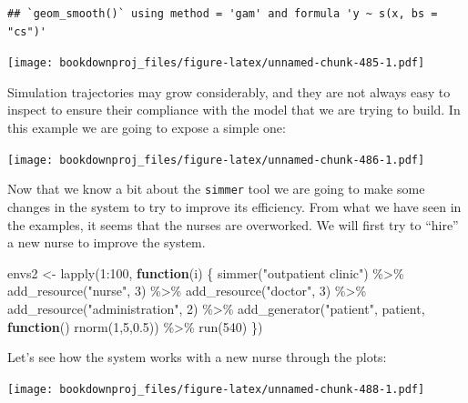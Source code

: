 \documentclass[
]{book}
\newenvironment{Shaded}{\begin{snugshade}}{\end{snugshade}}
\newcommand{\ControlFlowTok}[1]{\textcolor[rgb]{0.13,0.29,0.53}{\textbf{#1}}}
\newcommand{\DecValTok}[1]{\textcolor[rgb]{0.00,0.00,0.81}{#1}}
\newcommand{\FloatTok}[1]{\textcolor[rgb]{0.00,0.00,0.81}{#1}}
\newcommand{\FunctionTok}[1]{\textcolor[rgb]{0.00,0.00,0.00}{#1}}
\newcommand{\NormalTok}[1]{#1}
\newcommand{\OtherTok}[1]{\textcolor[rgb]{0.56,0.35,0.01}{#1}}
\newcommand{\SpecialCharTok}[1]{\textcolor[rgb]{0.00,0.00,0.00}{#1}}
\newcommand{\StringTok}[1]{\textcolor[rgb]{0.31,0.60,0.02}{#1}}
\theoremstyle{definition}
\theoremstyle{definition}
\theoremstyle{definition}
\theoremstyle{definition}
\theoremstyle{remark}
\begin{document}
\begin{verbatim}
## `geom_smooth()` using method = 'gam' and formula 'y ~ s(x, bs = "cs")'
\end{verbatim}

\texttt{[image: bookdownproj\_files/figure-latex/unnamed-chunk-485-1.pdf]}

Simulation trajectories may grow considerably, and they are not always easy to inspect to ensure their compliance with the model that we are trying to build. In this example we are going to expose a simple one:

\texttt{[image: bookdownproj\_files/figure-latex/unnamed-chunk-486-1.pdf]}

Now that we know a bit about the \texttt{simmer} tool we are going to make some changes in the system to try to improve its efficiency. From what we have seen in the examples, it seems that the nurses are overworked. We will first try to ``hire'' a new nurse to improve the system.

\begin{Shaded}
\begin{Highlighting}[]
\NormalTok{envs2 }\OtherTok{\textless{}{-}} \FunctionTok{lapply}\NormalTok{(}\DecValTok{1}\SpecialCharTok{:}\DecValTok{100}\NormalTok{, }\ControlFlowTok{function}\NormalTok{(i) \{}
  \FunctionTok{simmer}\NormalTok{(}\StringTok{"outpatient clinic"}\NormalTok{) }\SpecialCharTok{\%\textgreater{}\%}
    \FunctionTok{add\_resource}\NormalTok{(}\StringTok{"nurse"}\NormalTok{, }\DecValTok{3}\NormalTok{) }\SpecialCharTok{\%\textgreater{}\%}
    \FunctionTok{add\_resource}\NormalTok{(}\StringTok{"doctor"}\NormalTok{, }\DecValTok{3}\NormalTok{) }\SpecialCharTok{\%\textgreater{}\%}
    \FunctionTok{add\_resource}\NormalTok{(}\StringTok{"administration"}\NormalTok{, }\DecValTok{2}\NormalTok{) }\SpecialCharTok{\%\textgreater{}\%}
    \FunctionTok{add\_generator}\NormalTok{(}\StringTok{"patient"}\NormalTok{, patient, }\ControlFlowTok{function}\NormalTok{() }\FunctionTok{rnorm}\NormalTok{(}\DecValTok{1}\NormalTok{,}\DecValTok{5}\NormalTok{,}\FloatTok{0.5}\NormalTok{)) }\SpecialCharTok{\%\textgreater{}\%}
    \FunctionTok{run}\NormalTok{(}\DecValTok{540}\NormalTok{)}
\NormalTok{\})}
\end{Highlighting}
\end{Shaded}

Let's see how the system works with a new nurse through the plots:

\texttt{[image: bookdownproj\_files/figure-latex/unnamed-chunk-488-1.pdf]}
\end{document}

